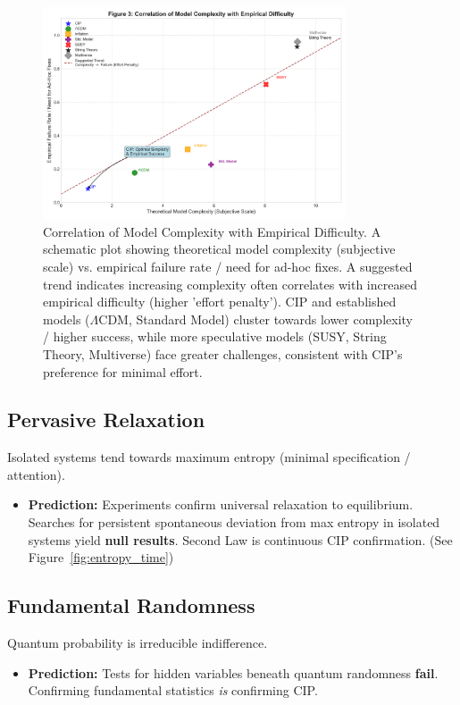 \documentclass[11pt, a4paper]{article}
\begin{document}
\begin{figure}[H]
    \centering
    \includegraphics[width=0.8\textwidth]{CIP_ComplexityDifficulty.png}
    \caption[Correlation of Model Complexity with Empirical Difficulty]{Correlation of Model Complexity with Empirical Difficulty. A schematic plot showing theoretical model complexity (subjective scale) vs. empirical failure rate / need for ad-hoc fixes. A suggested trend indicates increasing complexity often correlates with increased empirical difficulty (higher 'effort penalty'). CIP and established models ($\Lambda$CDM, Standard Model) cluster towards lower complexity / higher success, while more speculative models (SUSY, String Theory, Multiverse) face greater challenges, consistent with CIP's preference for minimal effort.}
    \label{fig:complexity_difficulty}
\end{figure}


\subsection{Pervasive Relaxation}
Isolated systems tend towards maximum entropy (minimal specification / attention).
\begin{itemize}
    \item \textbf{Prediction:} Experiments confirm universal relaxation to equilibrium. Searches for persistent spontaneous deviation from max entropy in isolated systems yield \textbf{null results}. Second Law is continuous CIP confirmation. (See Figure~\ref{fig:entropy_time})
\end{itemize}

\subsection{Fundamental Randomness}
Quantum probability is irreducible indifference.
\begin{itemize}
    \item \textbf{Prediction:} Tests for hidden variables beneath quantum randomness \textbf{fail}. Confirming fundamental statistics \textit{is} confirming CIP.
\end{itemize}
\end{document}
